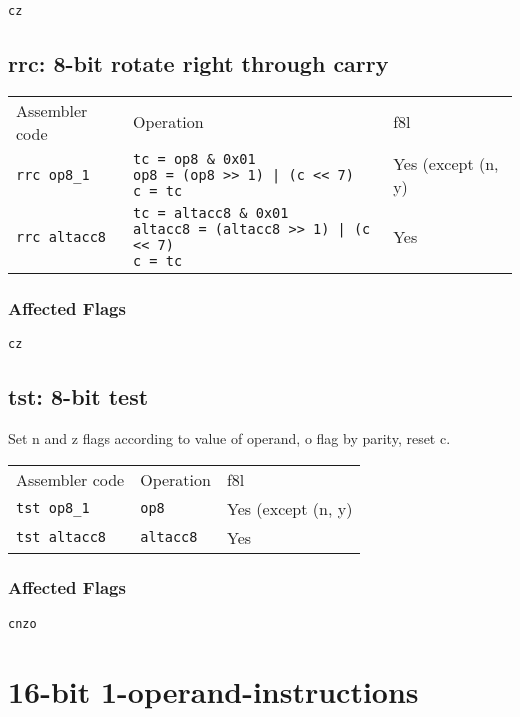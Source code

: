 \documentclass{book}
\begin{document}
\texttt{cz}


\subsection{rrc: 8-bit rotate right through carry}

\begin{tabular}{l l l}
Assembler code       & Operation                                                                                               & f8l \\
\texttt{rrc op8\_1}  & \makecell{\texttt{tc = op8  \& 0x01}\\\texttt{op8 = (op8 >> 1) | (c << 7)}\\\texttt{c = tc}}            & Yes (except (n, y) \\
\texttt{rrc altacc8} & \makecell{\texttt{tc = altacc8 \& 0x01}\\\texttt{altacc8 = (altacc8 >> 1) | (c << 7)}\\\texttt{c = tc}} & Yes
\end{tabular}

\subsubsection*{Affected Flags}

\texttt{cz}


\subsection{tst: 8-bit test}

Set n and z flags according to value of operand, o flag by parity, reset c.

\begin{tabular}{l l l}
Assembler code       & Operation        & f8l \\
\texttt{tst op8\_1}  & \texttt{op8}     & Yes (except (n, y) \\
\texttt{tst altacc8} & \texttt{altacc8} & Yes
\end{tabular}

\subsubsection*{Affected Flags}

\texttt{cnzo}


\section{16-bit 1-operand-instructions}
\end{document}
